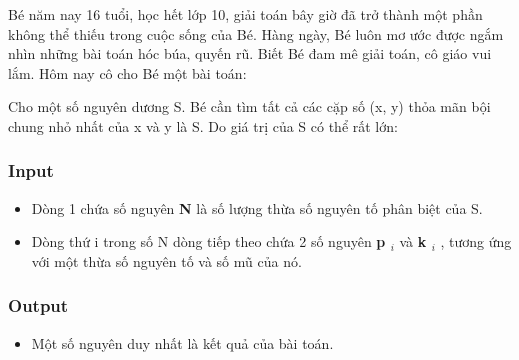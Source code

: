 



   Bé năm nay 16 tuổi, học hết lớp 10, giải toán bây giờ đã trở thành một phần không thể thiếu trong cuộc sống của Bé. Hàng ngày, Bé luôn mơ ước được ngắm nhìn  những bài toán hóc búa, quyến rũ. Biết Bé đam mê giải toán, cô giáo vui  lắm. Hôm nay cô cho Bé một bài toán:  

   Cho một số nguyên dương S. Bé cần tìm tất cả các cặp số (x, y) thỏa mãn bội chung nhỏ nhất của x và y là S. Do giá trị của S có thể rất lớn:  

\subsubsection{   Input  }
\begin{itemize}
	\item     Dòng 1 chứa số nguyên    \textbf{     N    }    là số lượng thừa số nguyên tố phân biệt của S.   
	\item     Dòng thứ i trong số N dòng tiếp theo chứa 2 số nguyên    \textbf{     p     $_      i     $}    và    \textbf{     k     $_      i     $}    , tương ứng với một thừa số nguyên tố và số mũ của nó.   
\end{itemize}

\subsubsection{   Output  }
\begin{itemize}
	\item     Một số nguyên duy nhất là kết quả của bài toán.   
\end{itemize}

